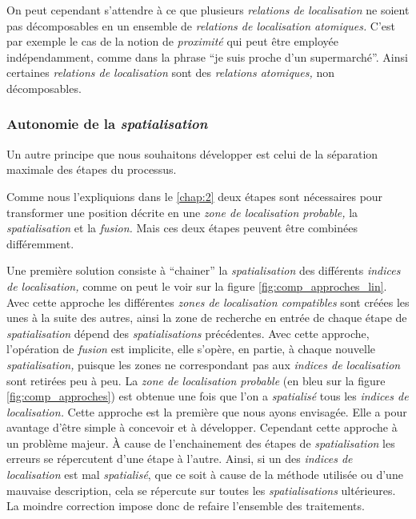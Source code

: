 On peut cependant s'attendre à ce que plusieurs \emph{relations de
  localisation} ne soient pas décomposables en un ensemble de
\emph{relations de localisation atomiques.} C'est par exemple le cas
de la notion de \emph{proximité} qui peut être employée
indépendamment, comme dans la phrase \enquote{je suis proche d'un
  supermarché}. Ainsi certaines \emph{relations de localisation} sont
des \emph{relations atomiques,} non décomposables.


\subsubsection{Autonomie de la \emph{spatialisation}}

Un autre principe que nous souhaitons développer est celui de la
séparation maximale des étapes du processus.

Comme nous l'expliquions dans le \autoref{chap:2} deux étapes sont
nécessaires pour transformer une position décrite en une \emph{zone de
  localisation probable,} la \emph{spatialisation} et la
\emph{fusion.} Mais ces deux étapes peuvent être combinées
différemment.

Une première solution consiste à \enquote{chainer} la
\emph{spatialisation} des différents \emph{indices de localisation,}
comme on peut le voir sur la figure \ref{fig:comp_approches_lin}. Avec
cette approche les différentes \emph{zones de localisation
  compatibles} sont créées les unes à la suite des autres, ainsi la
zone de recherche en entrée de chaque étape de \emph{spatialisation}
dépend des \emph{spatialisations} précédentes. Avec cette approche,
l'opération de \emph{fusion} est implicite, elle s'opère, en partie, à
chaque nouvelle \emph{spatialisation,} puisque les zones ne
correspondant pas aux \emph{indices de localisation} sont retirées peu
à peu. La \emph{zone de localisation probable} (en bleu sur la figure
\ref{fig:comp_approches}) est obtenue une fois que l'on a
\emph{spatialisé} tous les \emph{indices de localisation.} Cette
approche est la première que nous ayons envisagée. Elle a pour
avantage d'être simple à concevoir et à développer. Cependant cette
approche à un problème majeur. À cause de l'enchainement des étapes de
\emph{spatialisation} les erreurs se répercutent d'une étape à
l'autre. Ainsi, si un des \emph{indices de localisation} est mal
\emph{spatialisé}, que ce soit à cause de la méthode utilisée ou d'une
mauvaise description, cela se répercute sur toutes les
\emph{spatialisations} ultérieures. La moindre correction impose donc
de refaire l'ensemble des traitements.

